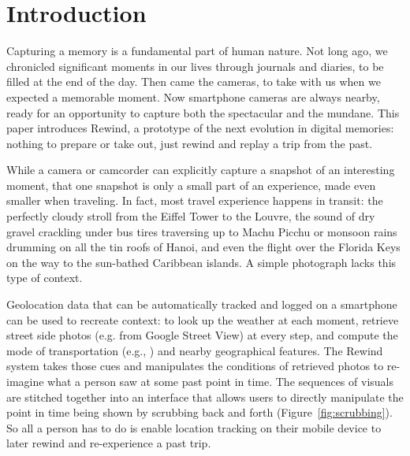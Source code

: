 \documentclass{sigchi}
\begin{document}


\section{Introduction}

Capturing a memory is a fundamental part of human nature. Not long ago, we chronicled significant moments in our lives through journals and diaries, to be filled at the end of the day. Then came the cameras, to take with us when we expected a memorable moment. Now smartphone cameras are always nearby, ready for an opportunity to capture both the spectacular and the mundane. This paper introduces Rewind, a prototype of the next evolution in digital memories: nothing to prepare or take out, just rewind and replay a trip from the past.
 
While a camera or camcorder can explicitly capture a snapshot of an interesting moment, that one snapshot is only a small part of an experience, made even smaller when traveling. In fact, most travel experience happens in transit: the perfectly cloudy stroll from the Eiffel Tower to the Louvre, the sound of dry gravel crackling under bus tires traversing up to Machu Picchu or monsoon rains drumming on all the tin roofs of Hanoi, and even the flight over the Florida Keys on the way to the sun-bathed Caribbean islands. A simple photograph lacks this type of context.


Geolocation data that can be automatically tracked and logged on a smartphone can be used to recreate context: to look up the weather at each moment,
retrieve street side photos (e.g. from Google Street View) at every step, and compute the mode of transportation (e.g., \cite{zheng2008learning}) and nearby geographical features. The Rewind system takes those cues and manipulates the conditions of retrieved photos to re-imagine what a person saw at some past point in time. The sequences of visuals are stitched together into an interface that allows users to directly manipulate the point in time being shown by scrubbing back and forth (Figure~\ref{fig:scrubbing}). So all a person has to do is enable location tracking on their mobile device to later rewind and re-experience a past trip.
\end{document}
